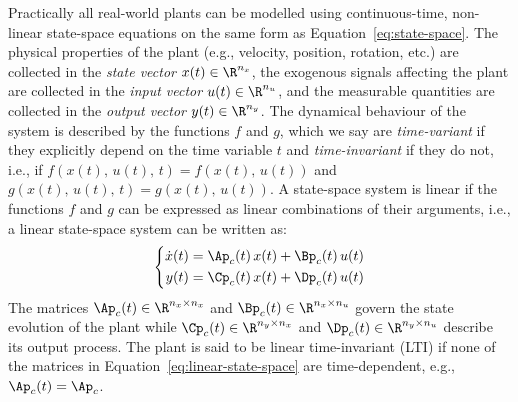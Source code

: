 Practically all real-world plants can be modelled using continuous-time, non-linear state-space equations on the same form as Equation~\eqref{eq:state-space}.
The physical properties of the plant (e.g., velocity, position, rotation, etc.) are collected in the \emph{state vector} $x(t) \in \R^{n_x}$, the exogenous signals affecting the plant are collected in the \emph{input vector} $u(t) \in \R^{n_u}$, and the measurable quantities are collected in the \emph{output vector} $y(t) \in \R^{n_y}$.
The dynamical behaviour of the system is described by the functions $f$ and $g$, which we say are \emph{time-variant} if they explicitly depend on the time variable $t$ and \emph{time-invariant} if they do not, i.e., if $f(x(t),\, u(t),\, t) = f(x(t),\, u(t))$ and $g(x(t),\, u(t),\, t) = g(x(t),\, u(t))$.
A state-space system is linear if the functions $f$ and $g$ can be expressed as linear combinations of their arguments, i.e., a linear state-space system can be written as:
%
\begin{equation}%
    \label{eq:linear-state-space}%
    \left\{\begin{aligned}
        \dot{x}(t) &= \Ap_c(t)\,x(t) + \Bp_c(t)\,u(t) \\
        y(t) &= \Cp_c(t)\,x(t) + \Dp_c(t)\,u(t) \\
    \end{aligned}\right.
\end{equation}
%
The matrices $\Ap_c(t) \in \R^{n_x \times n_x}$ and $\Bp_c(t) \in \R^{n_x \times n_u}$ govern the state evolution of the plant while $\Cp_c(t) \in \R^{n_y \times n_x}$ and $\Dp_c(t) \in \R^{n_y \times n_u}$ describe its output process.
The plant is said to be linear time-invariant (LTI) if none of the matrices in Equation~\eqref{eq:linear-state-space} are time-dependent, e.g., $\Ap_c(t) = \Ap_c$.

